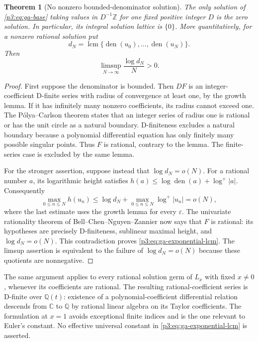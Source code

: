 \documentclass[11pt,a4paper]{article}
\newtheorem{theorem}{Theorem}[section]
\theoremstyle{definition}
\theoremstyle{remark}
\numberwithin{equation}{section}
\begin{document}
\begin{theorem}[No nonzero bounded-denominator solution]
\label{p3:thm:ga-integral-lattice}
The only solution of \eqref{p3:eq:ga-base} taking values in $D^{-1}\mathbb Z$
for one fixed positive integer $D$ is the zero solution. In particular,
its integral solution lattice is $\{0\}$.
More quantitatively, for a nonzero rational solution put
\[
 d_N=\operatorname{lcm}\{\operatorname{den}(u_0),\ldots,
                         \operatorname{den}(u_N)\}.
\]
Then
\begin{equation}\label{p3:eq:ga-exponential-lcm}
 \limsup_{N\to\infty}\frac{\log d_N}{N}>0.
\end{equation}
\end{theorem}
\begin{proof}
First suppose the denominator is bounded. Then $DF$ is an
integer-coefficient D-finite series with radius of convergence at least
one, by the growth lemma. If it has infinitely many nonzero
coefficients, its radius cannot exceed one. The P\'olya--Carlson theorem
states that an integer series of radius one is rational or has the
unit circle as a natural boundary. D-finiteness excludes a natural
boundary because a polynomial differential equation has only finitely
many possible singular points. Thus $F$ is rational, contrary to the
lemma. The finite-series case is excluded by the same lemma.

For the stronger assertion, suppose instead that $\log d_N=o(N)$.
For a rational number $a$, its logarithmic height satisfies
$h(a)\le\log\operatorname{den}(a)+\log^+|a|$. Consequently
\[
 \max_{0\le n\le N}h(u_n)
 \le \log d_N+\max_{0\le n\le N}\log^+|u_n|=o(N),
\]
where the last estimate uses the growth lemma for every $\varepsilon$.
The univariate rationality theorem of
Bell--Chen--Nguyen--Zannier \cite[Proposition 2.1]{p3:BCNZ23} now says
that $F$ is rational: its hypotheses are precisely D-finiteness,
sublinear maximal height, and $\log d_N=o(N)$. This contradiction
proves \eqref{p3:eq:ga-exponential-lcm}. The limsup assertion is equivalent
to the failure of $\log d_N=o(N)$ because these quotients are
nonnegative.
\end{proof}

The same argument applies to every rational solution germ of $L_x$
with fixed $x\ne0$, whenever its coefficients are rational. The
resulting rational-coefficient series is D-finite over $\mathbb Q(t)$:
existence of a polynomial-coefficient differential relation descends
from $\mathbb C$ to $\mathbb Q$ by rational linear algebra on its
Taylor coefficients. The
formulation at $x=1$ avoids exceptional finite indices and is the
one relevant to Euler's constant. No effective universal constant
in \eqref{p3:eq:ga-exponential-lcm} is asserted.
\end{document}
